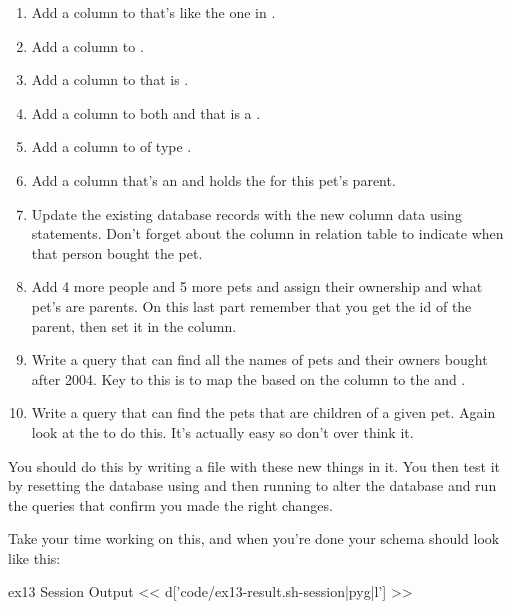 \begin{enumerate}
\item Add a  column to  that's like the one in .
\item Add a  column to .
\item Add a  column to  that is .
\item Add a  column to both  and  that is a .
\item Add a  column to  of type .
\item Add a  column that's an  and holds the 
    for this pet's parent.
\item Update the existing database records with the new column data using  statements.  Don't forget about the  column in  relation table to indicate when that person bought the pet.
\item Add 4 more people and 5 more pets and assign their ownership and what pet's
    are parents.  On this last part remember that you get the id of the parent, then
    set it in the  column.
\item Write a query that can find all the names of pets and their owners bought after
    2004. Key to this is to map the  based on the  column to the  and .
\item Write a query that can find the pets that are children of a given pet.  Again
    look at the  to do this.  It's actually easy so don't over
    think it.
\end{enumerate}

You should do this by writing a  file with these new things in it.
You then test it by resetting the database using  and then running
 to alter the database and run the  queries that
confirm you made the right changes.

Take your time working on this, and when you're done your schema should look
like this:

\begin{code}{ex13 Session Output}
<< d['code/ex13-result.sh-session|pyg|l'] >>
\end{code}

